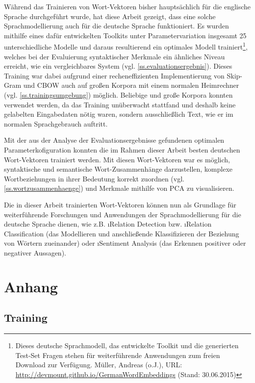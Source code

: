 Während das Trainieren von Wort-Vektoren bisher hauptsächlich für die englische Sprache durchgeführt wurde, hat diese Arbeit gezeigt, dass eine solche Sprachmodellierung auch für die deutsche Sprache funktioniert. Es wurden mithilfe eines dafür entwickelten Toolkits unter Parametervariation insgesamt 25 unterschiedliche Modelle und daraus resultierend ein optimales Modell trainiert\footnote{Dieses deutsche Sprachmodell, das entwickelte Toolkit und die generierten Test-Set Fragen stehen für weiterführende Anwendungen zum freien Download zur Verfügung. Müller, Andreas (o.J.), URL: \url{http://devmount.github.io/GermanWordEmbeddings} (Stand: 30.06.2015)}, welches bei der Evaluierung syntaktischer Merkmale ein ähnliches Niveau erreicht, wie ein vergleichbares System (vgl. \autoref{ss.evaluationsergebnis}). Dieses Training war dabei aufgrund einer recheneffizienten Implementierung von Skip-Gram und CBOW auch auf großen Korpora mit einem normalen Heimrechner (vgl. \autoref{ss.trainingsumgebung}) möglich. Beliebige und große Korpora konnten verwendet werden, da das Training unüberwacht stattfand und deshalb keine gelabelten Eingabedaten nötig waren, sondern ausschließlich Text, wie er im normalen Sprachgebrauch auftritt.

Mit der aus der Analyse der Evaluationsergebnisse gefundenen optimalen Parameterkofiguration konnten die im Rahmen dieser Arbeit besten deutschen Wort-Vektoren trainiert werden. Mit diesen Wort-Vektoren war es möglich, syntaktische und semantische Wort-Zusammenhänge darzustellen, komplexe Wortbeziehungen in ihrer Bedeutung korrekt zuordnen (vgl. \autoref{ss.wortzusammenhaenge}) und Merkmale mithilfe von PCA zu visualisieren.

Die in dieser Arbeit trainierten Wort-Vektoren können nun als Grundlage für weiterführende Forschungen und Anwendungen der Sprachmodellierung für die deutsche Sprache dienen, wie z.B. \i{Relation Detection} bzw. \i{Relation Classification} (das Modellieren und anschließende Klassifizieren der Beziehung von Wörtern zueinander) oder \i{Sentiment Analysis} (das Erkennen positiver oder negativer Aussagen).

\appendix
\chapter{Anhang}

\section{Training}
\begin{multicols}{8}
[]%

\end{multicols}


